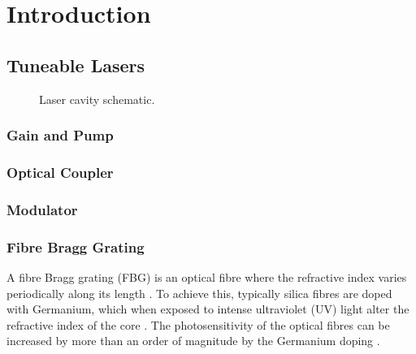 
\chapter{Introduction}


\section{Tuneable Lasers}
\begin{figure}[htbp]
\centering

\caption[Laser Cavity]{Laser cavity schematic.}
\label{fig:cavity}
\end{figure}

\subsection{Gain and Pump}

\subsection{Optical Coupler}

\subsection{Modulator}

\subsection{Fibre Bragg Grating}
A fibre Bragg grating (FBG) is an optical fibre where the refractive index varies periodically along its length \cite{ferreira}. To achieve this, typically silica fibres are doped with Germanium, which when exposed to intense ultraviolet (UV) light alter the refractive index of the core \cite{starodoumov}. The photosensitivity of the optical fibres can be increased by more than an order of magnitude by the Germanium doping \cite{ferreira}. \\

